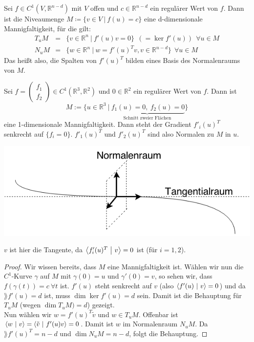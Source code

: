 \begin{satz}
Sei $f\in C^1\left(V,\mathbb{R}^{n-d}\right)$ mit $V$ offen und $c\in\mathbb{R}^{n-d}$ ein regulärer Wert von $f$. Dann ist die Niveaumenge $M\coloneqq\{v\in V \ | \ f(u)=c\}$ eine d-dimensionale Mannigfaltigkeit, für die gilt:
\begin{eqnarray*}
T_uM &=&\{v\in\mathbb{R}^n \ | \ f'(u)v=0\} \ \ \left(=\ker f'(u)\right) \ \ \forall u\in M \\
N_uM&=&\{w\in\mathbb{R}^n \ | \ w=f'(u)^Tv, v\in\mathbb{R}^{n-d}\} \ \ \forall u\in M 
\end{eqnarray*}
Das heißt also, die Spalten von $f'(u)^T$ bilden eines Basis des Normalenraums von $M$.
\end{satz}

\begin{beispiel}
Sei $f=\begin{pmatrix}
f_1 \\ f_2
\end{pmatrix}\in C^1\left(\mathbb{R}^3,\mathbb{R}^2\right)$ und $0\in\mathbb{R}^2$ ein regulärer Wert von $f$. Dann ist
\begin{equation*}
M:=\{u\in\mathbb{R}^3 \ | \underbrace{\ f_1(u)=0, \ f_2(u)=0}_{\text{Schnitt \ zweier \ Flächen}}\}
\end{equation*}
eine 1-dimensionale Mannigfaltigkeit. Dann steht der Gradient $f'_i(u)^T$ senkrecht auf $\{f_i=0\}$. $f'_1(u)^T$ und $f'_2(u)^T$ sind also Normalen zu $M$ in $u$.\\
\begin{center}
	\includegraphics[scale=0.5]{pictures/003-01.png}
\end{center}
$v$ ist hier die Tangente, da $\left\langle f'_i(u)^T \ \middle| \ v\right\rangle=0$ ist (für $i=1,2$).
\end{beispiel}

\begin{proof}
Wir wissen bereits, dass $M$ eine Mannigfaltigkeit ist. Wählen wir nun die $C^1$-Kurve $\gamma$ auf $M$ mit $\gamma(0)=u$ und $\gamma'(0)=v$, so sehen wir, dass $f(\gamma(t))=c \ \forall t$ ist. $f'(u)$ steht senkrecht auf $v$ (also $\left\langle f'(u) \ \middle| \ v\right\rangle=0$) und da $\rang f'(u)=d$ ist, muss $\dim \ker f'(u)=d$ sein. Damit ist die Behauptung für $T_uM$ (wegen $\dim T_uM)=d$) gezeigt.\\
Nun wählen wir $w=f'(u)^T\tilde{v}$ und $w\in T_uM$. Offenbar ist $\left\langle w \ \middle| \ v\right\rangle=\left\langle \tilde{v} \ \middle| \ f'(u)v\right\rangle=0$. Damit ist $w$ im Normalenraum $N_uM$. Da $\rang f'(u)^T=n-d$  und $\dim N_uM=n-d$, folgt die Behauptung.
\end{proof}

